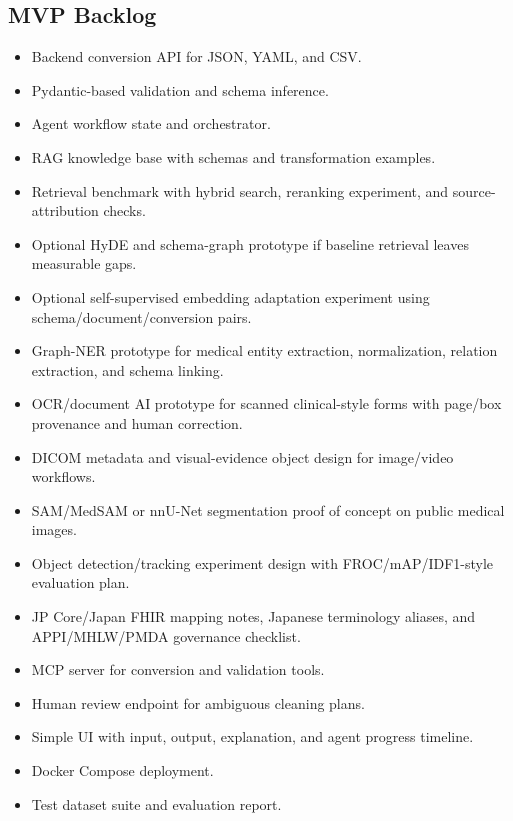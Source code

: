 \subsection{MVP Backlog}

\begin{itemize}
  \item Backend conversion API for JSON, YAML, and CSV.
  \item Pydantic-based validation and schema inference.
  \item Agent workflow state and orchestrator.
  \item RAG knowledge base with schemas and transformation examples.
  \item Retrieval benchmark with hybrid search, reranking experiment, and source-attribution checks.
  \item Optional HyDE and schema-graph prototype if baseline retrieval leaves measurable gaps.
  \item Optional self-supervised embedding adaptation experiment using schema/document/conversion pairs.
  \item Graph-NER prototype for medical entity extraction, normalization, relation extraction, and schema linking.
  \item OCR/document AI prototype for scanned clinical-style forms with page/box provenance and human correction.
  \item DICOM metadata and visual-evidence object design for image/video workflows.
  \item SAM/MedSAM or nnU-Net segmentation proof of concept on public medical images.
  \item Object detection/tracking experiment design with FROC/mAP/IDF1-style evaluation plan.
  \item JP Core/Japan FHIR mapping notes, Japanese terminology aliases, and APPI/MHLW/PMDA governance checklist.
  \item MCP server for conversion and validation tools.
  \item Human review endpoint for ambiguous cleaning plans.
  \item Simple UI with input, output, explanation, and agent progress timeline.
  \item Docker Compose deployment.
  \item Test dataset suite and evaluation report.
\end{itemize}
